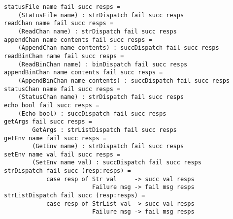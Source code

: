 \mbox{\tt statusFile\ name\ fail\ succ\ resps\ =}\\
\mbox{\tt \ \ \ \ (StatusFile\ name)\ :\ strDispatch\ fail\ succ\ resps}
\eprogB\noindent\bprogB
\mbox{\tt readChan\ name\ fail\ succ\ resps\ =}\\
\mbox{\tt \ \ \ \ (ReadChan\ name)\ :\ strDispatch\ fail\ succ\ resps}
\eprogB\noindent\bprogB
\mbox{\tt appendChan\ name\ contents\ fail\ succ\ resps\ =}\\
\mbox{\tt \ \ \ \ (AppendChan\ name\ contents)\ :\ succDispatch\ fail\ succ\ resps}
\eprogB\noindent\bprogB
\mbox{\tt readBinChan\ name\ fail\ succ\ resps\ =}\\
\mbox{\tt \ \ \ \ (ReadBinChan\ name)\ :\ binDispatch\ fail\ succ\ resps}
\eprogB\noindent\bprogB
\mbox{\tt appendBinChan\ name\ contents\ fail\ succ\ resps\ =}\\
\mbox{\tt \ \ \ \ (AppendBinChan\ name\ contents)\ :\ succDispatch\ fail\ succ\ resps}
\eprogB\noindent\bprogB
\mbox{\tt statusChan\ name\ fail\ succ\ resps\ =}\\
\mbox{\tt \ \ \ \ (StatusChan\ name)\ :\ strDispatch\ fail\ succ\ resps}
\eprogB\noindent\bprogB
\mbox{\tt echo\ bool\ fail\ succ\ resps\ =}\\
\mbox{\tt \ \ \ \ (Echo\ bool)\ :\ succDispatch\ fail\ succ\ resps}
\eprogB\noindent\bprogB
\mbox{\tt getArgs\ fail\ succ\ resps\ =}\\
\mbox{\tt \ \ \ \ \ \ \ \ GetArgs\ :\ strListDispatch\ fail\ succ\ resps}
\eprogB\noindent\bprogB
\mbox{\tt getEnv\ name\ fail\ succ\ resps\ =}\\
\mbox{\tt \ \ \ \ \ \ \ \ (GetEnv\ name)\ :\ strDispatch\ fail\ succ\ resps}
\eprogB\noindent\bprogB
\mbox{\tt setEnv\ name\ val\ fail\ succ\ resps\ =}\\
\mbox{\tt \ \ \ \ \ \ \ \ (SetEnv\ name\ val)\ :\ succDispatch\ fail\ succ\ resps}
\eprogB\noindent\bprogB
\mbox{\tt strDispatch\ fail\ succ\ (resp:resps)\ =\ }\\
\mbox{\tt \ \ \ \ \ \ \ \ \ \ \ \ case\ resp\ of\ Str\ val\ \ \ \ \ ->\ succ\ val\ resps}\\
\mbox{\tt \ \ \ \ \ \ \ \ \ \ \ \ \ \ \ \ \ \ \ \ \ \ \ \ \ Failure\ msg\ ->\ fail\ msg\ resps}
\eprogB\noindent\bprogB
\mbox{\tt strListDispatch\ fail\ succ\ (resp:resps)\ =\ }\\
\mbox{\tt \ \ \ \ \ \ \ \ \ \ \ \ case\ resp\ of\ StrList\ val\ ->\ succ\ val\ resps}\\
\mbox{\tt \ \ \ \ \ \ \ \ \ \ \ \ \ \ \ \ \ \ \ \ \ \ \ \ \ Failure\ msg\ ->\ fail\ msg\ resps}
